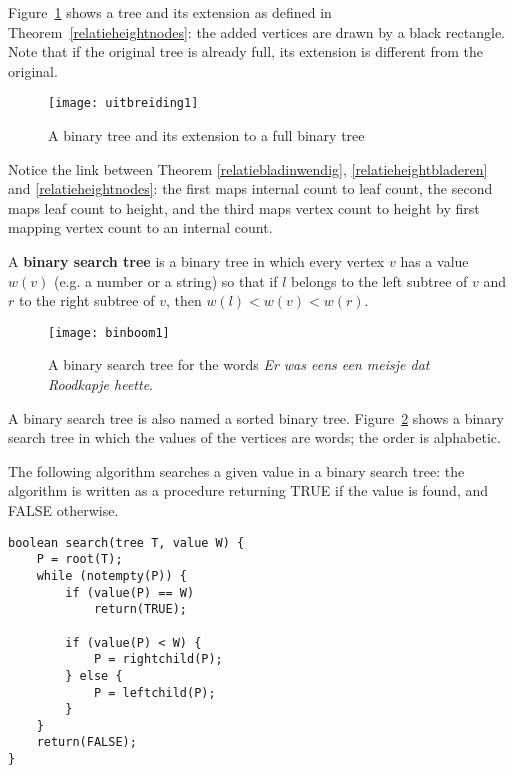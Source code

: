 Figure~\ref{uitbreiding1} shows a tree and its extension as defined in
Theorem~\ref{relatieheightnodes}: the added vertices are drawn by a
black rectangle. Note that if the original tree is already full, its
extension is different from the original.

\begin{figure}[ht]
	\centering
	\texttt{[image: uitbreiding1]}
	\caption{A binary tree and its extension to a full binary tree\label{uitbreiding1}}
\end{figure}

Notice the link between Theorem \ref{relatiebladinwendig}, \ref{relatieheightbladeren} and \ref{relatieheightnodes}: the first maps internal count to leaf count, the second maps leaf count to height, and the third maps vertex count to height by first mapping vertex count to an internal count.

\begin{definition}
	\textup{A \textbf{binary search tree} is a binary tree in which every
	vertex $v$ has a value $w(v)$ (e.g. a number or a string) so that
	if $l$ belongs to the left subtree of $v$ and $r$ to the right subtree
	of $v$, then  $w(l) < w(v) < w(r)$. }
\end{definition}

\begin{figure}[ht]
	\centering
	\texttt{[image: binboom1]}
	\caption{A binary search tree for the words
	{\em Er was eens een meisje dat Roodkapje heette}. \label{binboom1}}
\end{figure}

A binary search tree is also named a sorted binary tree. Figure~\ref{binboom1} shows a binary search tree in which the values
of the vertices are words; the order is alphabetic.

The following algorithm searches a given value in a binary search tree: the
algorithm is written as a procedure returning TRUE if the value is
found, and FALSE otherwise.
\begin{center}
\begin{BVerbatim}
boolean search(tree T, value W) {
	P = root(T);
	while (notempty(P)) {
		if (value(P) == W)
			return(TRUE);

		if (value(P) < W) {
			P = rightchild(P);
		} else {
			P = leftchild(P);
		}
	}
	return(FALSE);
}
\end{BVerbatim}
\end{center}

